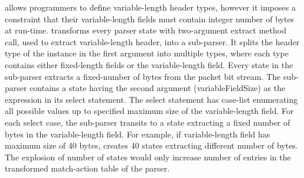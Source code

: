 \documentclass[letterpaper,twocolumn,10pt]{article}
\begin{document}
\ulang allows programmers to define variable-length header types, however it imposes a constraint that their variable-length fields must contain integer number of bytes at run-time.
\ucomp transforms every parser state with two-argument extract method call, used to extract variable-length header, into a sub-parser.
It splits the header type of the instance in the first argument into multiple types, where each type contains either fixed-length fields or the variable-length field.
Every state in the sub-parser extracts a fixed-number of bytes from the packet bit stream.
The sub-parser contains a state having the second argument (variableFieldSize) as the expression in its select statement.
The select statement has case-list enumerating all possible values up to specified maximum size of the variable-length field.
For each select case, the sub-parser transits to a state extracting a fixed number of bytes in the variable-length field.
For example, if variable-length field has maximum size of 40 bytes, \ucomp creates 40 states extracting different number of bytes.
The explosion of number of states would only increase number of entries in the transformed match-action table of the parser.

% 
% 
\end{document}
